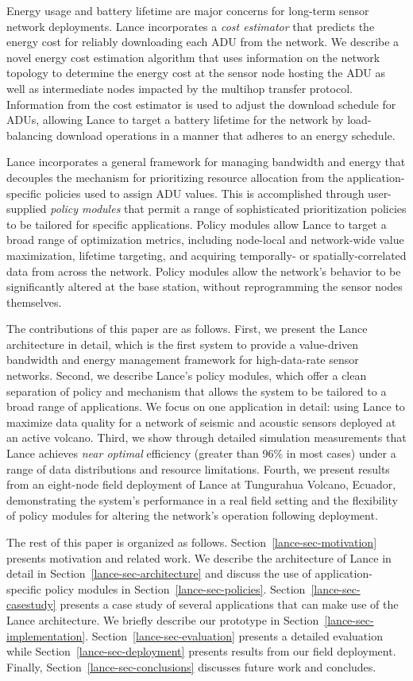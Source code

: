 Energy usage and battery lifetime are major concerns for long-term
sensor network deployments. 
Lance incorporates a {\em cost estimator} that
predicts the energy cost for reliably
downloading each ADU from the network. We describe a novel energy cost
estimation algorithm that uses information on the network topology to 
determine the energy cost at the sensor node hosting the ADU as well
as intermediate nodes impacted by the multihop transfer protocol. 
Information from the cost estimator is used to adjust the download
schedule for ADUs, allowing Lance to target a battery lifetime for 
the network by load-balancing download operations in a manner that
adheres to an energy schedule.

Lance incorporates a general framework for managing bandwidth and
energy that decouples the mechanism for prioritizing resource allocation from
the application-specific policies used to assign ADU values.
This is accomplished through user-supplied {\em policy modules} that
permit a range of sophisticated prioritization policies to be
tailored for specific applications. Policy modules allow Lance to
target a broad range of optimization metrics, including node-local and
network-wide value maximization, lifetime targeting, 
and acquiring temporally-
or spatially-correlated data from across the network. 
Policy modules allow the network's behavior to be significantly altered
at the base station, without reprogramming the sensor nodes themselves.

The contributions of this paper are as follows. First, we present the
Lance architecture in detail, which is the first system to provide 
a value-driven bandwidth and energy management framework for 
high-data-rate sensor networks. Second, we describe Lance's policy 
modules, which offer a clean separation of policy and mechanism that 
allows the system to be tailored to a broad range of applications. 
We focus on one application in detail: using Lance to maximize data 
quality for a network of seismic and acoustic sensors deployed at 
an active volcano. Third, we show through detailed simulation 
measurements that Lance achieves {\em near optimal} efficiency 
(greater than 96\% in most cases) under a range of data distributions 
and resource limitations. 
Fourth, we present results from 
an eight-node field deployment of Lance at Tungurahua Volcano, 
Ecuador, demonstrating the system's performance in a real 
field setting and the flexibility of policy modules for 
altering the network's operation following deployment. 

The rest of this paper is organized as follows.
Section~\ref{lance-sec-motivation} presents motivation and related
work. We describe the architecture of Lance in detail in
Section~\ref{lance-sec-architecture} and discuss the use of application-specific
policy modules in Section~\ref{lance-sec-policies}.  Section~\ref{lance-sec-casestudy}
presents a case study of several applications that can make use
of the Lance architecture.  We briefly describe our prototype in
Section~\ref{lance-sec-implementation}.  Section~\ref{lance-sec-evaluation}
presents a detailed evaluation while Section~\ref{lance-sec-deployment}
presents results from our field deployment. Finally,
Section~\ref{lance-sec-conclusions} discusses future work and concludes.

